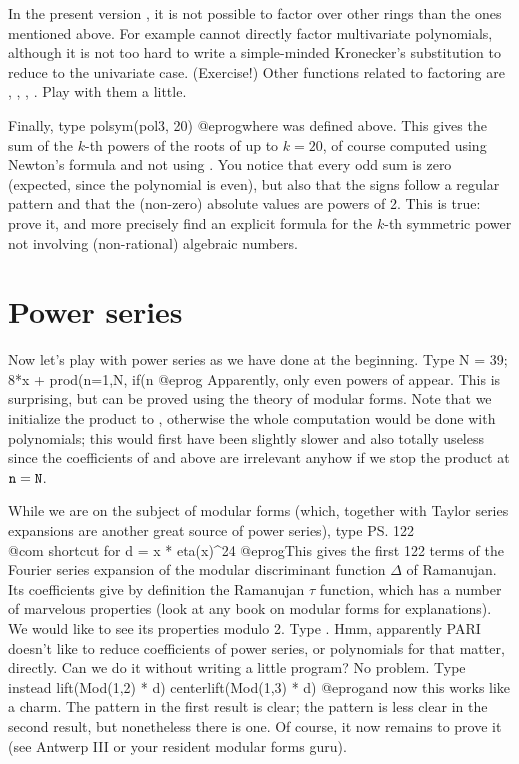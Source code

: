 In the present version \vers{}, it is not possible to factor over other
rings than the ones mentioned above. For example  cannot directly
factor multivariate polynomials, although it is not too hard to write a
simple-minded Kronecker's substitution to reduce to the univariate case.
(Exercise!) Other functions related to factoring are ,
, , . Play with them a
little.

Finally, type
\bprog
  polsym(pol3, 20)
@eprog\noindent where  was defined above. This gives the sum of the
$k$-th powers of the roots of  up to $k=20$, of course computed
using Newton's formula and not using . You notice that every
odd sum is zero (expected, since the polynomial is even), but also that
the signs follow a regular pattern and that the (non-zero) absolute values
are powers of 2. This is true: prove it, and more precisely find an explicit
formula for the $k$-th symmetric power not involving (non-rational) algebraic
numbers.

\section{Power series}

Now let's play with power series as we have done at the beginning.  Type
\bprog
  N = 39;
  8*x + prod(n=1,N, if(n%
@eprog\noindent
Apparently, only even powers of  appear. This is surprising, but can
be proved using the theory of modular forms. Note that we initialize
the product to , otherwise the whole computation would
be done with polynomials; this would first have been slightly slower and also
totally useless since the coefficients of  and above are
irrelevant anyhow if we stop the product at ${\tt n} = {\tt N}$.

While we are on the subject of modular forms (which, together with Taylor
series expansions are another great source of power series), type
\bprog
  \ps 122     \\@com shortcut for 
  d = x * eta(x)^24
@eprog\noindent This gives the first 122 terms of the Fourier series
expansion of the modular discriminant function $\Delta$ of Ramanujan. Its
coefficients give by definition the Ramanujan $\tau$ function, which has a
number of marvelous properties (look at any book on modular forms for
explanations). We would like to see its properties modulo 2. Type .
Hmm, apparently PARI doesn't like to reduce coefficients of power series, or
polynomials for that matter, directly. Can we do it without writing a little
program? No problem. Type instead
\bprog
  lift(Mod(1,2) * d)
  centerlift(Mod(1,3) * d)
@eprog\noindent and now this works like a charm. The pattern in the first
result is clear; the pattern is less clear in the second result, but
nonetheless there is one. Of course, it now remains to prove it (see Antwerp
III or your resident modular forms guru).

